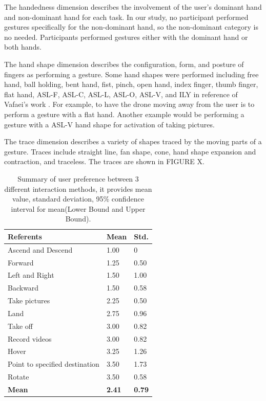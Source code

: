 \documentclass{sigchi}
\newcommand\tabhead[1]{\small\textbf{#1}}
\begin{document}
The handedness dimension describes the involvement of the user's dominant hand and non-dominant hand for each task. In our study, no participant performed gestures specifically for the non-dominant hand, so the non-dominant category is no needed. Participants performed gestures either with the dominant hand or both hands.

The hand shape dimension describes the configuration, form, and posture of fingers as performing a gesture. Some hand shapes were performed including free hand, ball holding, bent hand, fist, pinch, open hand, index finger, thumb finger, flat hand, ASL-F, ASL-C, ASL-L, ASL-O, ASL-V, and ILY in reference of Vafaei's work \cite{Vafaei:2013}. For example, to have the drone moving away from the user is to perform a gesture with a flat hand. Another example would be performing a gesture with a ASL-V hand shape for activation of taking pictures.

The trace dimension describes a variety of shapes traced by the moving parts of a gesture. Traces include straight line, fan shape, cone, hand shape expansion and contraction, and traceless. The traces are shown in FIGURE X.


  \begin{table}
    \centering
    \begin{adjustwidth}{}{}
    \begin{tabular}{|l|l|l|}
      \hline
      \tabhead{Referents} &
      \multicolumn{1}{|p{0.13\columnwidth}|}{\centering\tabhead{Mean}} &
      \multicolumn{1}{|p{0.13\columnwidth}|}{\centering\tabhead{Std.}} \\
      \hline
      Ascend and Descend & 1.00 & 0 \\
      \hline
      Forward & 1.25 & 0.50\\
      \hline
      Left and Right & 1.50 & 1.00 \\
      \hline
      Backward & 1.50 & 0.58 \\
      \hline
      Take pictures & 2.25 & 0.50 \\
      \hline
      Land & 2.75 & 0.96 \\
      \hline
      Take off & 3.00 & 0.82 \\
      \hline
      Record videos & 3.00 & 0.82 \\
      \hline
      Hover & 3.25 & 1.26 \\
      \hline
      Point to specified destination & 3.50 & 1.73 \\
      \hline
      Rotate & 3.50 & 0.58 \\
      \hline
      \bf{Mean} & \bf{2.41} & \bf{0.79}\\
      \hline

    \end{tabular}
    \caption{Summary of user preference between 3 different interaction methods, it provides mean value, standard deviation, 95\% confidence interval for mean(Lower Bound and Upper Bound).}
    \label{tab:table2}
  \end{adjustwidth}
  \end{table}
\end{document}
